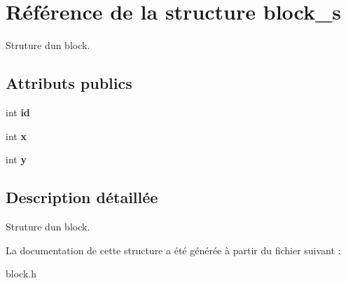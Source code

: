 \hypertarget{structblock__s}{}\section{Référence de la structure block\+\_\+s}
\label{structblock__s}


Struture d\textquotesingle{}un block.  


\subsection*{Attributs publics}
\begin{DoxyCompactItemize}
\item 
\mbox{\label{structblock__s_aa9dd98ce8df8bed4703396a0618131d8}} 
int {\bfseries id}
\item 
\mbox{\label{structblock__s_a78f591039c69f901f75461990bd0e343}} 
int {\bfseries x}
\item 
\mbox{\label{structblock__s_a03e2e847627473292542d6dcd3677ad2}} 
int {\bfseries y}
\end{DoxyCompactItemize}


\subsection{Description détaillée}
Struture d\textquotesingle{}un block. 

La documentation de cette structure a été générée à partir du fichier suivant \+:\begin{DoxyCompactItemize}
\item 
block.\+h\end{DoxyCompactItemize}
